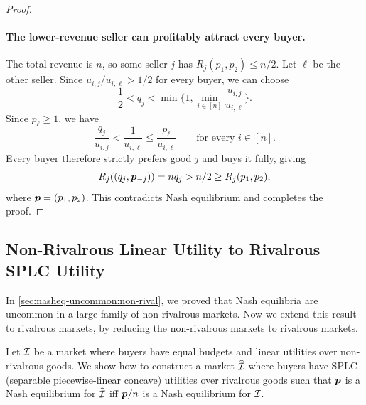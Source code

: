 \begin{proof}
\paragraph{The lower-revenue seller can profitably attract every buyer.}
The total revenue is $n$, so some seller $j$ has $R_j(p_1, p_2) \le n / 2$.
Let $\ell$ be the other seller. Since $u_{i,j} / u_{i,\ell} > 1 / 2$ for every buyer,
we can choose
\[ \frac12 < q_j < \min\bigg\{1, \min_{i \in [n]} \frac{u_{i,j}}{u_{i,\ell}}\bigg\}. \]
Since $p_\ell\ge1$, we have
\[ \frac{q_j}{u_{i,j}} < \frac{1}{u_{i,\ell}} \le \frac{p_\ell}{u_{i,\ell}}
\qquad \text{for every }i \in [n]. \]
Every buyer therefore strictly prefers good $j$ and buys it fully, giving
\[ R_j((q_j, \bm{p}_{-j})) = n q_j > n / 2 \ge R_j(p_1, p_2), \]
where $\bm{p} = (p_1, p_2)$.
This contradicts Nash equilibrium and completes the proof.
\end{proof}

\subsection{Non-Rivalrous Linear Utility to Rivalrous SPLC Utility}
\label{sec:lin-nonrival-to-splc-rival}

In \cref{sec:nasheq-uncommon:non-rival}, we proved that Nash equilibria are uncommon
in a large family of non-rivalrous markets. Now we extend this result to rivalrous markets,
by reducing the non-rivalrous markets to rivalrous markets.

Let $\mathcal{I}$ be a market where buyers have equal budgets and linear utilities over non-rivalrous goods.
We show how to construct a market $\widehat{\mathcal{I}}$ where buyers have
SPLC (separable piecewise-linear concave) utilities over rivalrous goods
such that $\bm{p}$ is a Nash equilibrium for $\widehat{\mathcal{I}}$ iff $\bm{p}/n$ is a Nash equilibrium for $\mathcal{I}$.


